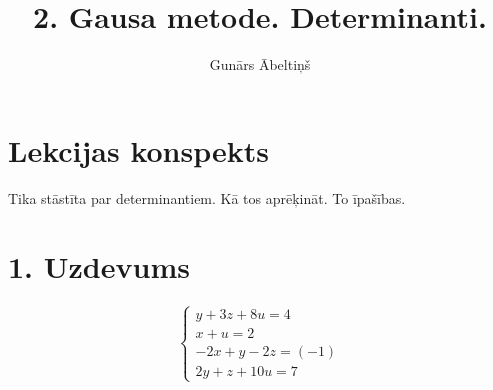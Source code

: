 \documentclass{article}
\title{2. Gausa metode. Determinanti.}
\author{Gunārs Ābeltiņš}
\date{}
\begin{document}
\maketitle

\section*{Lekcijas konspekts}
Tika stāstīta par determinantiem. Kā tos aprēķināt. To īpašības.

\section*{1. Uzdevums}
\begin{equation*}
    \begin{cases}
        y + 3z + 8u = 4\\
        x + u = 2\\
        -2x + y - 2z = (-1)\\
        2y + z + 10u = 7
    \end{cases}
\end{equation*}
\end{document}
